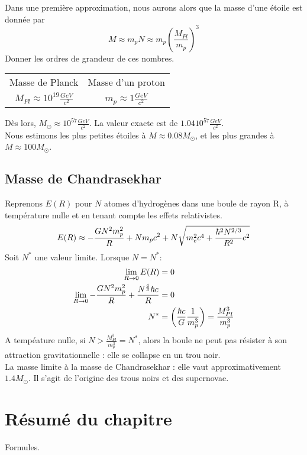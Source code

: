 \documentclass[../Notes de cours]{subfiles}
\begin{document}
Dans une première approximation, nous aurons alors que la masse d'une étoile est donnée par 
\begin{equation}
M \approx m_p N \approx m_p \left( \frac{M_{Pl}}{m_p} \right)^3
\end{equation}
Donner les ordres de grandeur de ces nombres.
\begin{center}
\begin{tabular}{c c}
Masse de Planck & Masse d'un proton\\
$M_{Pl} \approx 10^{19} \frac{GeV}{c^2}$ & $m_p \approx 1 \frac{GeV}{c^2}$
\end{tabular}
\end{center}
Dès lors, $ M_\odot \approx 10^{57} \frac{GeV}{c^2}$. La valeur exacte est de $1.04 10^{57} \frac{GeV}{c^2}$.\\

Nous estimons les plus petites étoiles à $M \approx 0.08 M_\odot$, et les plus grandes à $M \approx 100 M_\odot$.


\subsection{Masse de Chandrasekhar}
Reprenons $E(R)$ pour $N$ atomes d'hydrogènes dans une boule de rayon R, à température nulle et en tenant compte les effets relativistes.
\begin{equation}
E(R) \approx - \frac{GN^2 m_p^2}{R} + N m_p c^2 + N \sqrt{m_e^2c^4 + \frac{\hbar^2N^{2/3}}{R^2}c^2}
\end{equation}
Soit $N^*$ une valeur limite. Lorsque $N = N^*$:
\begin{align}
\lim_{R\to 0} E(R) &= 0\\
\lim_{R\to 0} - \frac{GN^2 m_p^2}{R} + \frac{N^{\frac{4}{3}}\hbar c}{R} &= 0\\
N^* &= \left( \frac{\hbar c}{G} \frac{1}{m_p^3} \right) = \frac{M_{Pl}^3}{m_p^3}
\end{align}
A tempéature nulle, si $N > \frac{M_{Pl}^3}{m_p^3} = N^*$, alors la boule ne peut pas résister à son attraction gravitationnelle : elle se collapse en un trou noir.\\

La masse limite à la masse de Chandrasekhar : elle vaut approximativement $1.4 M_\odot$. Il s'agit de l'origine des trous noirs et des supernovae.

\section*{Résumé du chapitre}

Formules.
\end{document}
